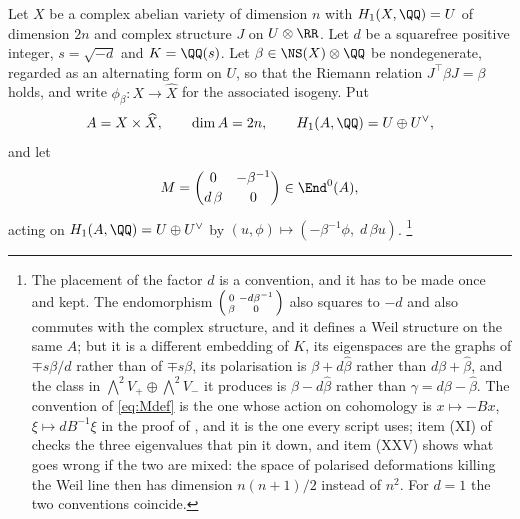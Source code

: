 \begin{setupenv}\label{setup:construction}
Let $X$ be a complex abelian variety of dimension $n$ with
$H_{1}(X,\QQ)=U$ of dimension $2n$ and complex structure $J$ on
$U\otimes\RR$. Let $d$ be a squarefree positive integer, $s=\sqrt{-d}$ and
$K=\QQ(s)$. Let $\beta\in\NS(X)\otimes\QQ$ be nondegenerate, regarded as an
alternating form on $U$, so that the Riemann relation $J^{\top}\beta J=\beta$
holds, and write $\phi_{\beta}\colon X\to\widehat{X}$ for the associated
isogeny. Put
\[
  A=X\times\widehat{X},\qquad \dim A=2n,\qquad
  H_{1}(A,\QQ)=U\oplus U^{\vee},
\]
and let
\begin{equation}\label{eq:Mdef}
  M=\begin{pmatrix}0 & -\beta^{-1}\\[2pt] d\,\beta & 0\end{pmatrix}
  \in\End^{0}(A),
\end{equation}
acting on $H_{1}(A,\QQ)=U\oplus U^{\vee}$ by
$(u,\phi)\mapsto(-\beta^{-1}\phi,\;d\,\beta u)$.%
\footnote{The placement of the factor $d$ is a convention, and it has to be
made once and kept. The endomorphism $\begin{psmallmatrix}0&-d\beta^{-1}\\
\beta&0\end{psmallmatrix}$ also squares to $-d$ and also commutes with the
complex structure, and it defines a Weil structure on the same $A$; but it
is a different embedding of $K$, its eigenspaces are the graphs of
$\mp s\beta/d$ rather than of $\mp s\beta$, its polarisation is
$\beta+d\widehat\beta$ rather than $d\beta+\widehat\beta$, and the class in
$\bigwedge^{2}V_{+}\oplus\bigwedge^{2}V_{-}$ it produces is
$\beta-d\widehat\beta$ rather than $\gamma=d\beta-\widehat\beta$. The
convention of \eqref{eq:Mdef} is the one whose action on cohomology is
$x\mapsto-Bx$, $\xi\mapsto dB^{-1}\xi$ in the proof of
, and it is the one every script uses; item (XI) of
 checks the three eigenvalues that pin it down, and
item (XXV) shows what goes wrong if the two are mixed: the space of
polarised deformations killing the Weil line then has dimension
$n(n+1)/2$ instead of $n^{2}$. For $d=1$ the two conventions coincide.}
\end{setupenv}

